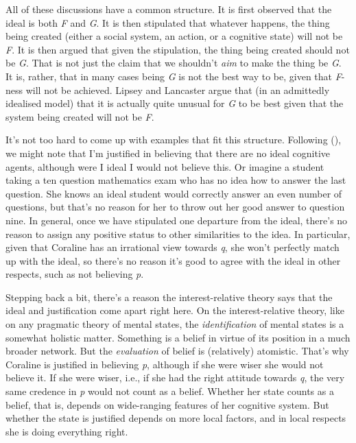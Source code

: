 \documentclass[
  11pt,
  letterpaper,
  DIV=11,
  numbers=noendperiod,
  twoside]{scrartcl}
\begin{document}
All of these discussions have a common structure. It is first observed
that the ideal is both \emph{F} and \emph{G}. It is then stipulated that
whatever happens, the thing being created (either a social system, an
action, or a cognitive state) will not be \emph{F}. It is then argued
that given the stipulation, the thing being created should not be
\emph{G}. That is not just the claim that we shouldn't \emph{aim} to
make the thing be \emph{G}. It is, rather, that in many cases being
\emph{G} is not the best way to be, given that \emph{F}-ness will not be
achieved. Lipsey and Lancaster argue that (in an admittedly idealised
model) that it is actually quite unusual for \emph{G} to be best given
that the system being created will not be \emph{F}.

It's not too hard to come up with examples that fit this structure.
Following (),
we might note that I'm justified in believing that there are no ideal
cognitive agents, although were I ideal I would not believe this. Or
imagine a student taking a ten question mathematics exam who has no idea
how to answer the last question. She knows an ideal student would
correctly answer an even number of questions, but that's no reason for
her to throw out her good answer to question nine. In general, once we
have stipulated one departure from the ideal, there's no reason to
assign any positive status to other similarities to the idea. In
particular, given that Coraline has an irrational view towards \emph{q},
she won't perfectly match up with the ideal, so there's no reason it's
good to agree with the ideal in other respects, such as not believing
\emph{p}.

Stepping back a bit, there's a reason the interest-relative theory says
that the ideal and justification come apart right here. On the
interest-relative theory, like on any pragmatic theory of mental states,
the \emph{identification} of mental states is a somewhat holistic
matter. Something is a belief in virtue of its position in a much
broader network. But the \emph{evaluation} of belief is (relatively)
atomistic. That's why Coraline is justified in believing \emph{p},
although if she were wiser she would not believe it. If she were wiser,
i.e., if she had the right attitude towards \emph{q}, the very same
credence in \emph{p} would not count as a belief. Whether her state
counts as a belief, that is, depends on wide-ranging features of her
cognitive system. But whether the state is justified depends on more
local factors, and in local respects she is doing everything right.
\end{document}
